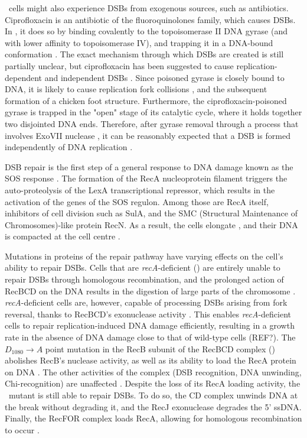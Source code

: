 \ecoli\ cells might also experience DSBs from exo\-genous sources, such as anti\-biotics. Ciprofloxacin is an antibiotic of the fluoro\-quinolones family, which causes DSBs. In \ecoli, it does so by binding covalently to the topoisomerase II DNA gyrase (and with lower affinity to topoisomerase IV), and trapping it in a DNA-bound conformation \cite{Kohanski2010}. The exact mechanism through which DSBs are created is still partially unclear, but ciprofloxacin has been suggested to cause replication-dependent and independent DSBs \cite{Ojkic2020}. Since poisoned gyrase is closely bound to DNA, it is likely to cause replication fork collisions \cite{Wentzell2000, Drlica2008}, and the subsequent formation of a chicken foot structure. Furthermore, the ciprofloxacin-poisoned gyrase is trapped in the "open" stage of its catalytic cycle, where it holds together two disjointed DNA ends. Therefore, after gyrase removal through a process that involves ExoVII nuclease \cite{Huang2021}, it can be reasonably expected that a DSB is formed independently of DNA replication \cite{Zhao2006}.

DSB repair is the first step of a general response to DNA damage known as the SOS response \cite{Baharoglu2014}. The formation of the RecA nucleoprotein filament triggers the auto-proteolysis of the LexA transcriptional repressor, which results in the activation of the genes of the SOS regulon. Among those are RecA itself, inhibitors of cell division such as SulA, and the SMC (Structural Maintenance of Chromosomes)-like protein RecN. As a result, the cells elongate \cite{Bos2015}, and their DNA is compacted at the cell centre \cite{Odsbu2014}.

Mutations in proteins of the repair pathway have varying effects on the cell's ability to repair DSBs. Cells that are \emph{recA}-deficient (\dreca) are entirely unable to repair DSBs through homologous recombination, and the prolonged action of RecBCD on the DNA results in the digestion of large parts of the chromosome \cite{Horii1968, Chow2007}. \emph{recA}-deficient cells are, however, capable of processing DSBs arising from fork reversal, thanks to RecBCD's exonuclease activity \cite{Seigneur1998, Michel2001}. This enables \emph{recA}-deficient cells to repair replication-induced DNA damage efficiently, resulting in a growth rate in the absence of DNA damage close to that of wild-type cells (REF?). The $D_{1080} \rightarrow A$ point mutation in the RecB subunit of the RecBCD complex (\teneighty) abolishes RecB's nuclease activity, as well as its ability to load the RecA protein on DNA \cite{Yu1998, Wang2000}. The other activities of the complex (DSB recognition, DNA unwinding, Chi-recognition) are unaffected \cite{Anderson1999}. Despite the loss of its RecA loading activity, the \geneteneighty\ mutant is still able to repair DSBs. To do so, the \teneighty CD complex unwinds DNA at the break without degrading it, and the RecJ exonuclease degrades the 5' ssDNA. Finally, the RecFOR complex loads RecA, allowing for homologous recombination to occur \cite{Ivancic-Bace_2003}.


